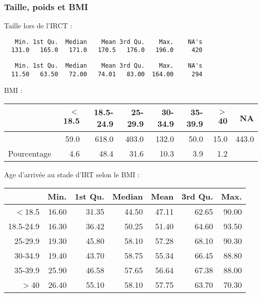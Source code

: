 \documentclass[11pt,a4paper]{article}\usepackage[]{graphicx}\usepackage[]{color}
\makeatletter
\newenvironment{kframe}{%
 \def\at@end@of@kframe{}%
 \ifinner\ifhmode%
  \def\at@end@of@kframe{\end{minipage}}%
  \begin{minipage}{\columnwidth}%
 \fi\fi%
 \def\FrameCommand##1{\hskip\@totalleftmargin \hskip-\fboxsep
 \colorbox{shadecolor}{##1}\hskip-\fboxsep
     \hskip-\linewidth \hskip-\@totalleftmargin \hskip\columnwidth}%
 \MakeFramed {\advance\hsize-\width
   \@totalleftmargin\z@ \linewidth\hsize
   \@setminipage}}%
 {\par\unskip\endMakeFramed%
 \at@end@of@kframe}
\newenvironment{knitrout}{}{} %
\makeatother
\begin{document}
    \subsubsection{Taille, poids et BMI}
  
Taille lors de l'IRCT :
  
\begin{knitrout}
\color{fgcolor}\begin{kframe}
\begin{verbatim}
   Min. 1st Qu.  Median    Mean 3rd Qu.    Max.    NA's 
  131.0   165.0   171.0   170.5   176.0   196.0     420 
\end{verbatim}
\end{kframe}
\end{knitrout}

\begin{knitrout}
\color{fgcolor}\begin{kframe}
\begin{verbatim}
   Min. 1st Qu.  Median    Mean 3rd Qu.    Max.    NA's 
  11.50   63.50   72.00   74.01   83.00  164.00     294 
\end{verbatim}
\end{kframe}
\end{knitrout}

BMI :

\begin{table}[H]
\centering
\begin{tabular}{rrrrrrrr}
  \hline
 & $<$18.5 & 18.5-24.9 & 25-29.9 & 30-34.9 & 35-39.9 & $>$40 & NA \\ 
  \hline
 & 59.0 & 618.0 & 403.0 & 132.0 & 50.0 & 15.0 & 443.0 \\ 
  Pourcentage & 4.6 & 48.4 & 31.6 & 10.3 & 3.9 & 1.2 &  \\ 
   \hline
\end{tabular}
\end{table}


Age d'arrivée au stade d'IRT selon le BMI :

\begin{table}[H]
\centering
\begin{tabular}{rrrrrrr}
  \hline
 & Min. & 1st Qu. & Median & Mean & 3rd Qu. & Max. \\ 
  \hline
$<$18.5 & 16.60 & 31.35 & 44.50 & 47.11 & 62.65 & 90.00 \\ 
  18.5-24.9 & 16.30 & 36.42 & 50.25 & 51.40 & 64.60 & 93.50 \\ 
  25-29.9 & 19.30 & 45.80 & 58.10 & 57.28 & 68.10 & 90.30 \\ 
  30-34.9 & 19.40 & 43.70 & 58.75 & 55.34 & 66.45 & 88.80 \\ 
  35-39.9 & 25.90 & 46.58 & 57.65 & 56.64 & 67.38 & 88.00 \\ 
  $>$40 & 26.40 & 55.10 & 58.10 & 57.75 & 63.70 & 70.30 \\ 
   \hline
\end{tabular}
\end{table}
\end{document}
